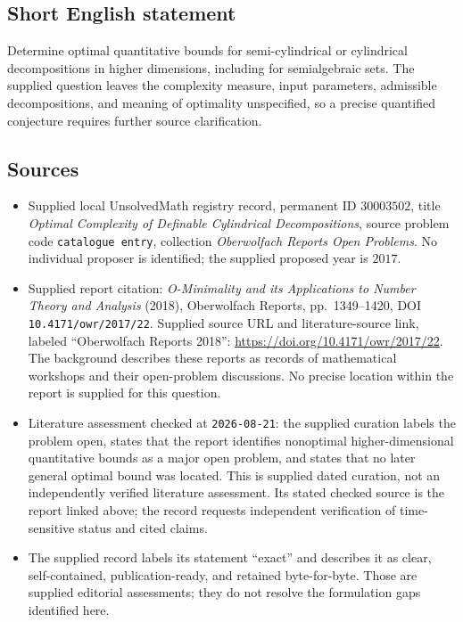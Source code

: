 \documentclass[11pt]{article}
\begin{document}
\subsection{Short English statement}
Determine optimal quantitative bounds for semi-cylindrical or cylindrical decompositions in higher dimensions, including for semialgebraic sets. The supplied question leaves the complexity measure, input parameters, admissible decompositions, and meaning of optimality unspecified, so a precise quantified conjecture requires further source clarification.
\subsection{Sources}
\begin{itemize}
\item Supplied local UnsolvedMath registry record, permanent ID \(30003502\), title \emph{Optimal Complexity of Definable Cylindrical Decompositions}, source problem code \texttt{catalogue entry}, collection \emph{Oberwolfach Reports Open Problems}. No individual proposer is identified; the supplied proposed year is \(2017\).
\item Supplied report citation: \emph{O-Minimality and its Applications to Number Theory and Analysis} (2018), Oberwolfach Reports, pp.\ 1349--1420, DOI \texttt{10.4171/owr/2017/22}. Supplied source URL and literature-source link, labeled ``Oberwolfach Reports 2018'': \url{https://doi.org/10.4171/owr/2017/22}. The background describes these reports as records of mathematical workshops and their open-problem discussions. No precise location within the report is supplied for this question.
\item Literature assessment checked at \texttt{2026-08-21}: the supplied curation labels the problem open, states that the report identifies nonoptimal higher-dimensional quantitative bounds as a major open problem, and states that no later general optimal bound was located. This is supplied dated curation, not an independently verified literature assessment. Its stated checked source is the report linked above; the record requests independent verification of time-sensitive status and cited claims.
\item The supplied record labels its statement ``exact'' and describes it as clear, self-contained, publication-ready, and retained byte-for-byte. Those are supplied editorial assessments; they do not resolve the formulation gaps identified here.
\end{itemize}
\end{document}
